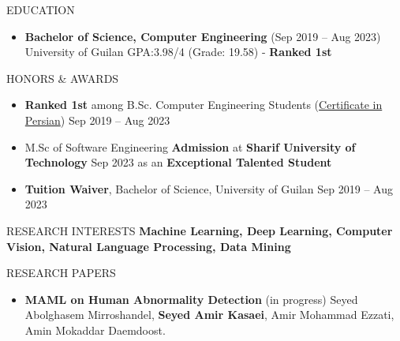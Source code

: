 \documentclass[]{CV}
\begin{document}
\resumeheader
{}
{}
{}
{}


\vspace{-4mm}
\begin{flushright}
\end{flushright}

\vspace{-7mm}
\begin{section}{EDUCATION}
\begin{itemize}
\item \textbf{Bachelor of Science, Computer Engineering} \hfill (Sep 2019 -- Aug 2023)\newline
{University of Guilan \newline GPA:3.98/4 (Grade: 19.58) - \textbf{Ranked 1st}}
\end{itemize}
\end{section}

\vspace{-2mm}
\begin{section}{HONORS \& AWARDS}
\begin{itemize}
\item \textbf{Ranked 1st} among B.Sc. Computer Engineering Students (\href{https://drive.google.com/file/d/1RfuN4xRnWvJ53gFADrlBrSxIEHqgPVWS/view?usp=sharing}{Certificate in Persian}) \hfill Sep 2019 -- Aug 2023 

\item M.Sc of Software Engineering \textbf{Admission} at \textbf{Sharif University of Technology} \hfill Sep 2023
\newline as an \textbf{Exceptional Talented Student} 

\item \textbf{Tuition Waiver}, Bachelor of Science, University of Guilan \hfill Sep 2019 -- Aug 2023 
\end{itemize}
\end{section}
\begin{section}{RESEARCH INTERESTS}
    \textbf{Machine Learning, Deep Learning, Computer Vision, Natural Language Processing, Data Mining}
\end{section}

\begin{section}{RESEARCH PAPERS}
\begin{itemize}
\item \textbf{MAML on Human Abnormality Detection} \hfill (in progress)\newline
Seyed Abolghasem Mirroshandel, \textbf{Seyed Amir Kasaei}, Amir Mohammad  Ezzati, Amin Mokaddar Daemdoost.
\end{itemize}
\end{section}
\vspace{-2mm}
\end{document}

